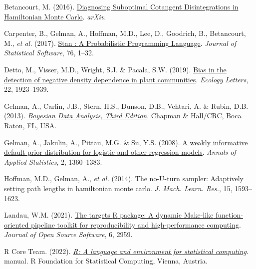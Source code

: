 \documentclass[
  12pt,
  letterpaper,
  DIV=11,
  numbers=noendperiod]{scrartcl}
\newlength{\cslhangindent}
\newlength{\cslentryspacingunit} %
\newenvironment{CSLReferences}[2] %
 {%
  \setlength{\parindent}{0pt}
  \ifodd #1
  \let\oldpar\par
  \def\par{\hangindent=\cslhangindent\oldpar}
  \fi
  \setlength{\parskip}{#2\cslentryspacingunit}
 }%
 {}
\begin{document}
\hypertarget{refs}{}
\begin{CSLReferences}{1}{0}
\leavevmode{}%
Betancourt, M. (2016).
\href{https://doi.org/10.48550/arXiv.1604.00695}{Diagnosing {Suboptimal
Cotangent Disintegrations} in {Hamiltonian Monte Carlo}}. \emph{arXiv}.

\leavevmode{}%
Carpenter, B., Gelman, A., Hoffman, M.D., Lee, D., Goodrich, B.,
Betancourt, M., \emph{et al.} (2017).
\href{https://doi.org/10.18637/jss.v076.i01}{Stan : {A Probabilistic
Programming Language}}. \emph{Journal of Statistical Software}, 76,
1--32.

\leavevmode{}%
Detto, M., Visser, M.D., Wright, S.J. \& Pacala, S.W. (2019).
\href{https://doi.org/10.1111/ele.13372}{Bias in the detection of
negative density dependence in plant communities}. \emph{Ecology
Letters}, 22, 1923--1939.

\leavevmode{}%
Gelman, A., Carlin, J.B., Stern, H.S., Dunson, D.B., Vehtari, A. \&
Rubin, D.B. (2013).
\emph{\href{https://books.google.com.pa/books?id=eSHSBQAAQBAJ}{Bayesian
{Data Analysis}, {Third Edition}}}. {Chapman \& Hall/CRC}, {Boca Raton,
FL, USA.}

\leavevmode{}%
Gelman, A., Jakulin, A., Pittau, M.G. \& Su, Y.S. (2008).
\href{https://doi.org/10.1214/08-AOAS191}{A weakly informative default
prior distribution for logistic and other regression models}.
\emph{Annals of Applied Statistics}, 2, 1360--1383.

\leavevmode{}%
Hoffman, M.D., Gelman, A., \emph{et al.} (2014). The no-{U-turn}
sampler: Adaptively setting path lengths in hamiltonian monte carlo.
\emph{J. Mach. Learn. Res.}, 15, 1593--1623.

\leavevmode{}%
Landau, W.M. (2021). \href{https://doi.org/10.21105/joss.02959}{The
targets {R} package: A dynamic {Make-like} function-oriented pipeline
toolkit for reproducibility and high-performance computing}.
\emph{Journal of Open Source Software}, 6, 2959.

\leavevmode{}%
R Core Team. (2022). \emph{\href{https://www.R-project.org/}{R: {A}
language and environment for statistical computing}}. manual. {R
Foundation for Statistical Computing}, {Vienna, Austria}.


\end{CSLReferences}
\end{document}
